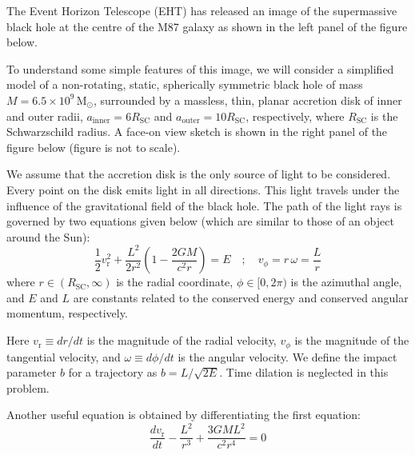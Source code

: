 The Event Horizon Telescope (EHT) has released an image of the supermassive
black hole at the centre of the M87 galaxy as shown in the left panel of the
figure below.

To understand some simple features of this image, we will consider a
simplified model of a non-rotating, static, spherically symmetric black hole
of mass $M = 6.5 \times 10^9\,\mathrm{M}_\odot$, surrounded by a massless,
thin, planar accretion disk of inner and outer radii,
$a_{\mathrm{inner}} = 6R_{\mathrm{SC}}$ and
$a_{\mathrm{outer}} = 10R_{\mathrm{SC}}$, respectively, where
$R_{\mathrm{SC}}$ is the Schwarzschild radius. A face-on view sketch is shown
in the right panel of the figure below (figure is not to scale).


We assume that the accretion disk is the only source of light to be
considered. Every point on the disk emits light in all directions. This light
travels under the influence of the gravitational field of the black hole. The
path of the light rays is governed by two equations given below (which are
similar to those of an object around the Sun):
\[ \frac{1}{2}v_{\mathrm{r}}^2 + \frac{L^2}{2r^2}
   \left(1 - \frac{2GM}{c^2 r}\right) = E
   \quad ; \quad
   v_\phi = r\,\omega = \frac{L}{r} \]
where $r \in (R_{\mathrm{SC}}, \infty)$ is the radial coordinate,
$\phi \in [0, 2\pi)$ is the azimuthal angle, and $E$ and $L$ are constants
related to the conserved energy and conserved angular momentum, respectively.

Here $v_{\mathrm{r}} \equiv dr/dt$ is the magnitude of the radial velocity,
$v_\phi$ is the magnitude of the tangential velocity, and
$\omega \equiv d\phi/dt$ is the angular velocity. We define the impact
parameter $b$ for a trajectory as $b = L/\sqrt{2E}$. Time dilation is
neglected in this problem.

Another useful equation is obtained by differentiating the first equation:
\[ \frac{dv_{\mathrm{r}}}{dt} - \frac{L^2}{r^3} + \frac{3GML^2}{c^2 r^4} = 0
\]

